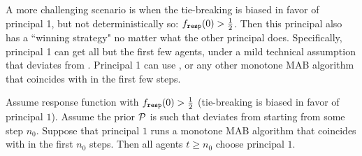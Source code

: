 A more challenging scenario is when the tie-breaking is biased in favor of principal 1, but not deterministically so: $f_{\mathtt{resp}}(0)>\tfrac12$. Then this principal also has a ``winning strategy" no matter what the other principal does. Specifically, principal 1 can get all but the first few agents, under a mild technical assumption that \DynGreedy deviates from \StaticGreedy. Principal 1 can use \DynGreedy, or any other monotone MAB algorithm that coincides with \DynGreedy in the first few steps.



\begin{theorem}\label{thm:HardMax-biased}
Assume \HardMax response function with $f_{\mathtt{resp}}(0)>\tfrac12$ (\ie tie-breaking is biased in favor of principal $1$). Assume the prior $\mathcal{P}$ is such that \DynGreedy deviates from \StaticGreedy starting from some step $n_0$. Suppose that principal $1$ runs a monotone MAB algorithm that coincides with \DynGreedy in the first $n_0$ steps. Then all agents $t\geq n_0$ choose principal $1$.
\end{theorem}


